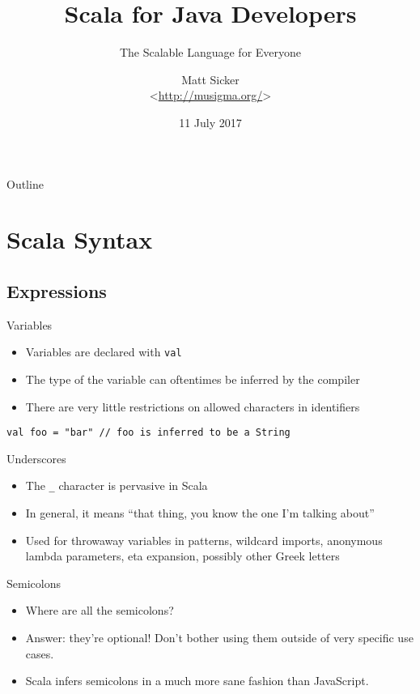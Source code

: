 \documentclass{beamer}
\title{Scala for Java Developers}
\subtitle{The Scalable Language for Everyone}
\author[Matt Sicker @jvz]{Matt Sicker \\ <\url{http://musigma.org/}>}
\institute{SPR Consulting}
\date{11 July 2017}
\begin{document}
\lstset{language=Scala}

\begin{frame}
  \titlepage
\end{frame}

\begin{frame}{Outline}
  \tableofcontents
\end{frame}

\section{Scala Syntax}

\subsection{Expressions}

\begin{frame}[fragile]{Variables}
\begin{itemize}
\item Variables are declared with \lstinline{val}
\item The type of the variable can oftentimes be inferred by the compiler
\item There are very little restrictions on allowed characters in identifiers
\end{itemize}
\begin{lstlisting}
val foo = "bar" // foo is inferred to be a String
\end{lstlisting}
\end{frame}

\begin{frame}{Underscores}
\begin{itemize}
\item The \lstinline{_} character is pervasive in Scala
\item In general, it means ``that thing, you know the one I'm talking about''
\item Used for throwaway variables in patterns, wildcard
imports, anonymous lambda parameters, eta expansion, possibly other Greek letters
\end{itemize}
\end{frame}

\begin{frame}{Semicolons}
\begin{itemize}
\item Where are all the semicolons?
\item Answer: they're optional! Don't bother using them outside of very specific use cases.
\item Scala infers semicolons in a much more sane fashion than JavaScript.
\end{itemize}
\end{frame}
\end{document}
